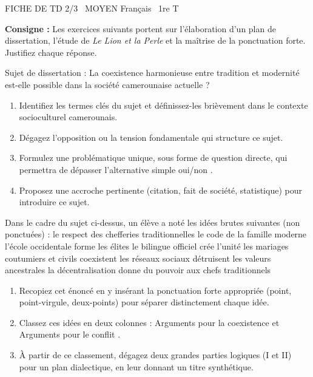 \documentclass[11pt]{article}
\begin{document}
\begin{tcolorbox}[enhanced,colback=popink,colframe=popink,arc=10pt,boxrule=0pt,left=12pt,right=12pt,top=9pt,bottom=9pt]
{\color{white}\popxbold\small FICHE DE TD 2/3 \textbullet\ MOYEN \hfill Français \textbullet\ 1re T\par}
\end{tcolorbox}
\vspace{4pt}
\noindent \textbf{Consigne :} Les exercices suivants portent sur l'élaboration d'un plan de dissertation, l'étude de \textit{Le Lion et la Perle} et la maîtrise de la ponctuation forte. Justifiez chaque réponse.

\begin{exercice}
Sujet de dissertation : \og La coexistence harmonieuse entre tradition et modernité est-elle possible dans la société camerounaise actuelle ? \fg
\begin{enumerate}
    \item Identifiez les termes clés du sujet et définissez-les brièvement dans le contexte socioculturel camerounais.
    \item Dégagez l'opposition ou la tension fondamentale qui structure ce sujet.
    \item Formulez une problématique unique, sous forme de question directe, qui permettra de dépasser l'alternative simple \og oui/non \fg.
    \item Proposez une accroche pertinente (citation, fait de société, statistique) pour introduire ce sujet.
\end{enumerate}
\end{exercice}

\begin{exercice}
Dans le cadre du sujet ci-dessus, un élève a noté les idées brutes suivantes (non ponctuées) :
\og le respect des chefferies traditionnelles le code de la famille moderne l'école occidentale forme les élites le bilingue officiel crée l'unité les mariages coutumiers et civils coexistent les réseaux sociaux détruisent les valeurs ancestrales la décentralisation donne du pouvoir aux chefs traditionnels \fg
\begin{enumerate}
    \item Recopiez cet énoncé en y insérant la ponctuation forte appropriée (point, point-virgule, deux-points) pour séparer distinctement chaque idée.
    \item Classez ces idées en deux colonnes : \og Arguments pour la coexistence \fg et \og Arguments pour le conflit \fg.
    \item À partir de ce classement, dégagez deux grandes parties logiques (I et II) pour un plan dialectique, en leur donnant un titre synthétique.
\end{enumerate}
\end{exercice}
\end{document}
